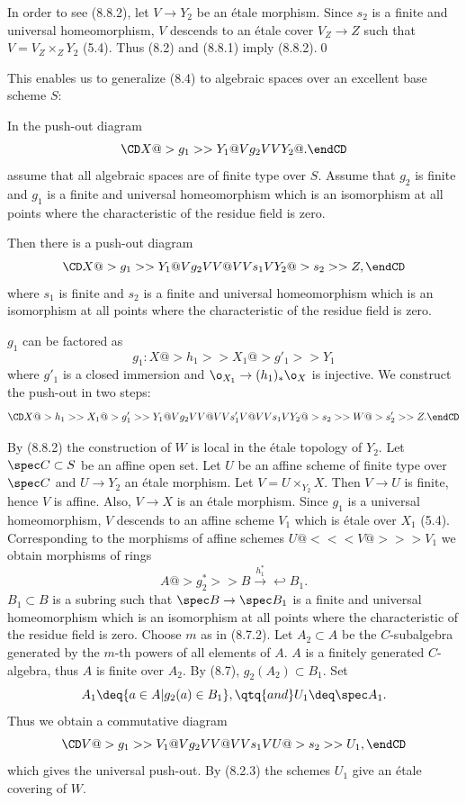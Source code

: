 In order to see (8.8.2), let $V\to Y_2$ be an \'etale morphism. Since $s_2$ is
a  finite and universal
homeomorphism, $V$ descends to an \'etale cover $V_Z\to Z$ such that
$V=V_Z\times_ZY_2$ (5.4). Thus (8.2)  and (8.8.1) imply (8.8.2).\qed\enddemo


This enables us to generalize (8.4) to algebraic spaces over an excellent base
scheme
$S$:


  In the push-out diagram
$$
\CD
X@>g_1>> Y_1\\
@Vg_2VV \\
Y_2 @.
\endCD
$$
 assume
that all algebraic spaces are of finite type over $S$. Assume
that
$g_2$ is finite and
$g_1$ is a finite and universal homeomorphism which is an isomorphism
at all points where the characteristic of the residue field is zero.

  Then there is a push-out  diagram
$$
\CD
X@>g_1>> Y_1\\
@Vg_2VV  @VVs_1V\\
Y_2 @>s_2>>  Z,
\endCD
$$
where $s_1$ is finite and
$s_2$ is a finite and universal homeomorphism which is an isomorphism
at all points where the characteristic of the residue field is zero.
\endproclaim

\demop $g_1$ can be factored as
$$
g_1:X@>h_1>> X_1@>g'_1>> Y_1
$$
where $g'_1$ is a closed immersion and  $\o_{X_1}\to (h_1)_*\o_X$ is
injective.  We construct the push-out in two steps:
$$
\CD
X@>h_1>> X_1@>g'_1>> Y_1\\
@Vg_2VV  @VVs'_1V @VVs_1V\\
Y_2 @>s_2>>  W @>s'_2>>  Z.
\endCD
$$

By (8.8.2) the construction of $W$ is  local in the \'etale topology of $Y_2$.
Let $\spec C\subset S$ be an affine open  set.
 Let $U$ be an affine scheme of finite type over $\spec C$ and $U\to Y_2$
an \'etale morphism. Let   $V= U\times_{Y_2}X$. Then $V\to U$ is finite,
hence $V$ is affine. Also, $V\to X$ is
an \'etale morphism. Since
$g_1$ is a universal homeomorphism, $V$ descends to an affine scheme $V_1$
which is
\'etale over
$X_1$ (5.4). Corresponding to the morphisms of affine schemes
$U@<<< V@>>> V_1$ we obtain
morphisms of rings
$$
A@>g_2^*>> B\overset{h_1^*}\to{\hookleftarrow} B_1.
$$
$B_1\subset B$ is a subring such that $\spec B\to
\spec B_1$ is a finite and universal homeomorphism which is an isomorphism
at all points where the characteristic of the residue field is zero.
Choose $m$ as in (8.7.2).  Let $A_2\subset A$ be the $C$-subalgebra generated
by the
$m$-th powers of all elements of $A$.   $A$ is a finitely generated
$C$-algebra, thus $A$ is finite over $A_2$.
By  (8.7), $g_2(A_2)\subset B_1$.
Set
$$
A_1\deq \{a\in A\vert g_2(a)\in B_1\}, \qtq{and} U_1\deq \spec A_1.
$$
Thus we obtain a commutative diagram
$$
\CD
V@>g_1>> V_1\\
@Vg_2VV  @VVs_1V\\
U @>s_2>>  U_1,
\endCD
$$
which gives the universal push-out. By (8.2.3)  the schemes $U_1$ give an
\'etale covering of $W$.


